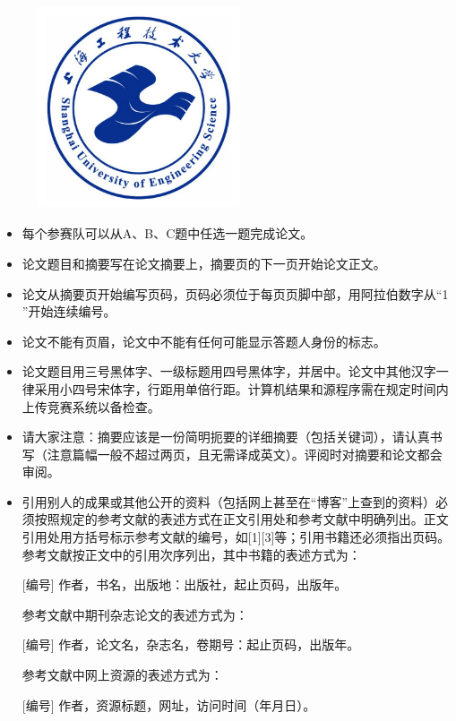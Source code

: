 \documentclass[bwprint]{suesmmthesis}
\begin{document}
    \begin{center}
        \begin{figure}
            \centering
            \includegraphics[width=6cm,height=6cm]{sues-logo.jpg}
        \end{figure}
        \xinwei{}

        \xinwei{}

        \xinwei{}
    \end{center}

    \vspace{0.5cm}
    \begin{itemize}\fangsong
        \item 每个参赛队可以从A、B、C题中任选一题完成论文。
        \item 论文题目和摘要写在论文摘要上，摘要页的下一页开始论文正文。
        \item 论文从摘要页开始编写页码，页码必须位于每页页脚中部，用阿拉伯数字从“1 ”开始连续编号。
        \item 论文不能有页眉，论文中不能有任何可能显示答题人身份的标志。
        \item 论文题目用三号黑体字、一级标题用四号黑体字，并居中。论文中其他汉字一律采用小四号宋体字，行距用单倍行距。计算机结果和源程序需在规定时间内上传竞赛系统以备检查。
        \item 请大家注意：摘要应该是一份简明扼要的详细摘要（包括关键词），请认真书写（注意篇幅一般不超过两页，且无需译成英文）。评阅时对摘要和论文都会审阅。
        \item 引用别人的成果或其他公开的资料（包括网上甚至在“博客”上查到的资料）必须按照规定的参考文献的表述方式在正文引用处和参考文献中明确列出。正文引用处用方括号标示参考文献的编号，如[1][3]等；引用书籍还必须指出页码。参考文献按正文中的引用次序列出，其中书籍的表述方式为：
        
        \hspace{2em}[编号] 作者，书名，出版地：出版社，起止页码，出版年。

        参考文献中期刊杂志论文的表述方式为：

        \hspace{2em}[编号] 作者，论文名，杂志名，卷期号：起止页码，出版年。

        参考文献中网上资源的表述方式为：

        \hspace{2em}[编号] 作者，资源标题，网址，访问时间（年月日）。
    \end{itemize}
\end{document}
